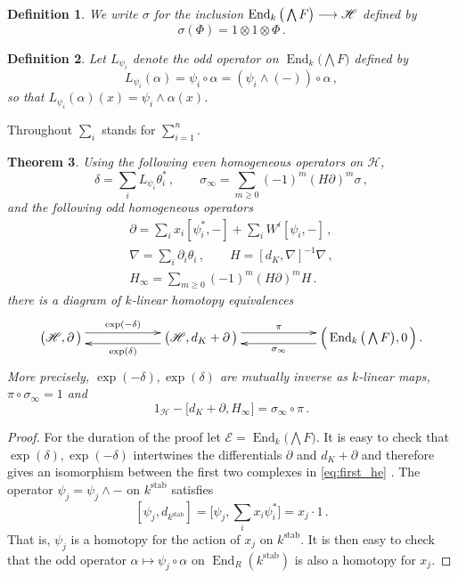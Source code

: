 \documentclass[english,letter paper,12pt,leqno]{article}
\newtheorem{theorem}{Theorem}[section]
\theoremstyle{example}
\newtheorem{definition}[theorem]{Definition}
\numberwithin{equation}{section}
\def\stab{\operatorname{stab}}
\def\be{\begin{equation}}
\def\ee{\end{equation}}
\DeclareMathOperator{\End}{End}
\begin{document}
\begin{definition} We write $\sigma$ for the inclusion $\End_k\big( \bigwedge F \big) \lto \mathscr{H}$ defined by
\[
\sigma( \Phi ) = 1 \otimes 1 \otimes \Phi\,.
\]
\end{definition}

\begin{definition}\label{defn:lpsi} Let $L_{\psi_i}$ denote the odd operator on $\End_k\big( \bigwedge F \big)$ defined by
\[
L_{\psi_i}( \alpha ) = \psi_i \circ \alpha = (\psi_i \wedge (-)) \circ \alpha\,,
\]
so that $L_{\psi_i}(\alpha)(x) = \psi_i \wedge \alpha(x)$.
\end{definition}

Throughout $\sum_i$ stands for $\sum_{i=1}^n$.

\begin{theorem} Using the following even homogeneous operators on $\mathscr{H}$,
\be
\delta = \sum_i L_{\psi_i} \theta_i^*\,, \qquad \sigma_\infty = \sum_{m \ge 0} (-1)^m (H \partial)^m \sigma\,,\label{eq:sigmainftyorig}
\ee
and the following odd homogeneous operators
\begin{gather}
\partial = \sum_i x_i [\psi_i^*,-] + \sum_i W^i [\psi_i,-]\,,\\
\nabla = \sum_i \partial_i \theta_i\,, \qquad H = [d_K, \nabla]^{-1} \nabla\,,\label{defn:Horiginal}\\
H_\infty = \sum_{m \ge 0} (-1)^m (H \partial)^m H\,.\label{eq:hinftyorig}
\end{gather}
there is a diagram of $k$-linear homotopy equivalences
\be\label{eq:first_he}
\xymatrix@C+3pc{
\big( \mathscr{H}, \partial \,\big) \ar@<1ex>[r]^-{\exp(-\delta)} & \big( \mathscr{H}, d_K + \partial \,\big) \ar@<1ex>[l]^-{ \exp(\delta) } \ar@<1ex>[r]^-{\pi} & \Big( \End_k\big( \bigwedge F \big), 0 \,\Big)\,.\ar@<1ex>[l]^-{ \sigma_\infty }
}
\ee
More precisely, $\exp(-\delta), \exp(\delta)$ are mutually inverse as $k$-linear maps, $\pi \circ \sigma_\infty = 1$ and
\be
1_{\mathscr{H}} - \big[ d_K + \partial, H_\infty \big] = \sigma_\infty \circ \pi\,.
\ee
\end{theorem}
\begin{proof}
For the duration of the proof let $\mathscr{E} = \End_k\big( \bigwedge F \big)$. It is easy to check that $\exp(\delta),\exp(-\delta)$ intertwines the differentials $\partial$ and $d_K + \partial$ and therefore gives an isomorphism between the first two complexes in \eqref{eq:first_he} \cite[Proposition 4.11]{murfet}. The operator $\psi_j = \psi_j \wedge -$ on $k^{\stab}$ satisfies
\[
[ \psi_j, d_{k^{\stab}} ] = \big[ \psi_j, \sum_i x_i \psi_i^* \big] = x_j \cdot 1\,.
\]
That is, $\psi_j$ is a homotopy for the action of $x_j$ on $k^{\stab}$. It is then easy to check that the odd operator $\alpha \mapsto \psi_j \circ \alpha$ on $\End_R(k^{\stab})$ is also a homotopy for $x_j$.
\end{proof}
\end{document}

